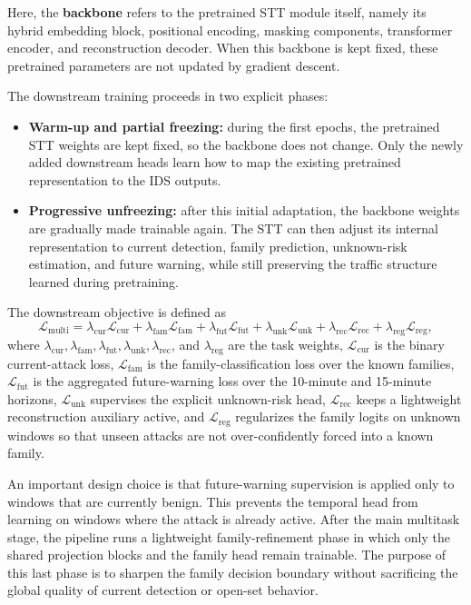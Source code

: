 \documentclass[12pt, a4paper]{report}
\begin{document}
Here, the \textbf{backbone} refers to the pretrained STT module itself, namely its hybrid embedding block, positional encoding, masking components, transformer encoder, and reconstruction decoder. When this backbone is kept fixed, these pretrained parameters are not updated by gradient descent.

The downstream training proceeds in two explicit phases:
\begin{itemize}
    \item \textbf{Warm-up and partial freezing:} during the first epochs, the pretrained STT weights are kept fixed, so the backbone does not change. Only the newly added downstream heads learn how to map the existing pretrained representation to the IDS outputs.
    \item \textbf{Progressive unfreezing:} after this initial adaptation, the backbone weights are gradually made trainable again. The STT can then adjust its internal representation to current detection, family prediction, unknown-risk estimation, and future warning, while still preserving the traffic structure learned during pretraining.
\end{itemize}

The downstream objective is defined as
\begin{equation}
\mathcal{L}_{\mathrm{multi}} = \lambda_{\mathrm{cur}}\mathcal{L}_{\mathrm{cur}} + \lambda_{\mathrm{fam}}\mathcal{L}_{\mathrm{fam}} + \lambda_{\mathrm{fut}}\mathcal{L}_{\mathrm{fut}} + \lambda_{\mathrm{unk}}\mathcal{L}_{\mathrm{unk}} + \lambda_{\mathrm{rec}}\mathcal{L}_{\mathrm{rec}} + \lambda_{\mathrm{reg}}\mathcal{L}_{\mathrm{reg}},
\end{equation}
where $\lambda_{\mathrm{cur}}, \lambda_{\mathrm{fam}}, \lambda_{\mathrm{fut}}, \lambda_{\mathrm{unk}}, \lambda_{\mathrm{rec}}$, and $\lambda_{\mathrm{reg}}$ are the task weights, $\mathcal{L}_{\mathrm{cur}}$ is the binary current-attack loss, $\mathcal{L}_{\mathrm{fam}}$ is the family-classification loss over the known families, $\mathcal{L}_{\mathrm{fut}}$ is the aggregated future-warning loss over the 10-minute and 15-minute horizons, $\mathcal{L}_{\mathrm{unk}}$ supervises the explicit unknown-risk head, $\mathcal{L}_{\mathrm{rec}}$ keeps a lightweight reconstruction auxiliary active, and $\mathcal{L}_{\mathrm{reg}}$ regularizes the family logits on unknown windows so that unseen attacks are not over-confidently forced into a known family.

An important design choice is that future-warning supervision is applied only to windows that are currently benign. This prevents the temporal head from learning on windows where the attack is already active. After the main multitask stage, the pipeline runs a lightweight family-refinement phase in which only the shared projection blocks and the family head remain trainable. The purpose of this last phase is to sharpen the family decision boundary without sacrificing the global quality of current detection or open-set behavior.
\end{document}
